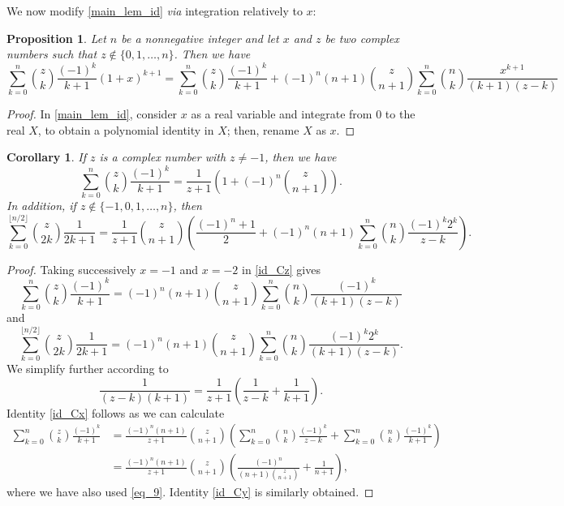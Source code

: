 \documentclass[11pt,reqno]{amsart}
\theoremstyle{plain}
\numberwithin{equation}{section}
\newtheorem{proposition}[thm]{Proposition}
\newtheorem{corollary}[thm]{Corollary}
\begin{document}
We now modify \eqref{main_lem_id} \textit{via} integration relatively to $x$: 

\begin{proposition}
Let $n$ be a nonnegative integer and let $x$ and $z$ be two complex numbers such that $z\notin\{0,1,\ldots,n\}$. Then we have
\begin{equation}\label{id_Cz}
\sum_{k=0}^n\binom{z}{k}\frac{(-1)^k}{k+1}(1+x)^{k+1}=\sum_{k=0}^n\binom{z}{k}\frac{(-1)^k}{k+1}+(-1)^n(n+1)\binom{z}{n+1}\sum_{k=0}^n\binom{n}{k}\frac{x^{k+1}}{(k+1)(z-k)}
\end{equation}
\end{proposition}
\begin{proof}
In \eqref{main_lem_id}, consider $x$ as a real variable and integrate from $0$ to the  real $X$, to obtain a polynomial identity in $X$; then, rename $X$ as $x$. 
\end{proof}

\begin{corollary}
If $z$ is a complex number with $z\neq -1$, then we have
\begin{equation}\label{id_Cx}
\sum_{k=0}^n \binom{z}{k} \frac{(-1)^k}{k+1} = \frac{1}{z+1}\left (1+(-1)^n \binom{z}{n+1}\right ).
\end{equation}
In addition, if $z\notin\{-1,0,1,\ldots,n\}$, then 
\begin{equation}\label{id_Cy}
\sum_{k=0}^{\lfloor{n/2}\rfloor} \binom{z}{2k} \frac{1}{2k+1} = \frac{1}{z+1} \binom{z}{n+1} \left(\frac{(-1)^{n}+1}{2} + (-1)^n (n+1) 
\sum_{k=0}^n \binom{n}{k} \frac{(-1)^k 2^k}{z-k} \right ).
\end{equation}
\end{corollary}
\begin{proof}
Taking successively $x=-1$ and $x=-2$ in \eqref{id_Cz} gives 
\begin{equation*}
\sum_{k=0}^n\binom{z}{k}\frac{(-1)^k}{k+1} = (-1)^n(n+1)\binom{z}{n+1}\sum_{k=0}^n\binom{n}{k}\frac{(-1)^k}{(k+1)(z-k)}
\end{equation*}
and
\begin{equation*}
\sum_{k=0}^{\lfloor{n/2}\rfloor}\binom{z}{2k}\frac{1}{2k+1} = (-1)^n(n+1)\binom{z}{n+1}\sum_{k=0}^n\binom{n}{k}\frac{(-1)^k 2^k}{(k+1)(z-k)}.
\end{equation*}
We simplify further according to
$$\frac{1}{(z-k)(k+1)} = \frac{1}{z+1}\left (\frac{1}{z-k}+\frac{1}{k+1} \right ).$$
Identity \eqref{id_Cx} follows as we can calculate
\begin{align*}
\sum_{k=0}^n \binom{z}{k} \frac{(-1)^k}{k+1} &= \frac{(-1)^n (n+1)}{z+1}\binom{z}{n+1}\left ( \sum_{k=0}^n \binom{n}{k} \frac{(-1)^k}{z-k} + 
\sum_{k=0}^n \binom{n}{k} \frac{(-1)^k}{k+1} \right ) \\
&= \frac{(-1)^n (n+1)}{z+1}\binom{z}{n+1}\left ( \frac{(-1)^n}{(n+1)\binom{z}{n+1}} + \frac{1}{n+1} \right ),
\end{align*}
where we have also used \eqref{eq_9}. Identity \eqref{id_Cy} is similarly obtained. 
\end{proof}
\end{document}
